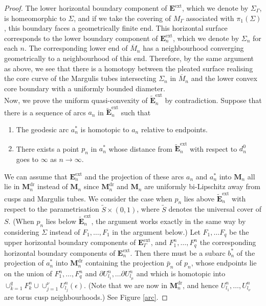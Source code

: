 \documentclass{amsart}
\theoremstyle{definition}
\begin{document}
\begin{proof}
The lower horizontal boundary component of $\mathbf E^\mathrm{ext}$, which we denote by $\Sigma_\Gamma$, is homeomorphic to $\Sigma$, and if we take the covering of $M_\Gamma$ associated with $\pi_1(\Sigma)$, this boundary faces a geometrically finite end.
This horizontal surface corresponds to the lower boundary component of $\mathbf E_n^\mathrm{ext}$, which we denote by $\Sigma_n$ for each $n$.
The corresponding lower end of $\overline M_n$ has a neighbourhood converging geometrically to a neighbourhood of this end.
Therefore, by the same argument as above, we see that there is a homotopy between the pleated surface realising the core curve of the Margulis tubes intersecting $\Sigma_n$ in $\overline{M}_n$ and the lower convex core boundary with a uniformly bounded diameter.\\

Now, we prove the uniform quasi-convexity of $\widetilde{\mathbf E}^\mathrm{ext}_n$ by contradiction.
Suppose that there is a sequence of arcs $a_n$ in $\widetilde{\mathbf E}^\mathrm{ext}_n$ such that
\begin{enumerate}
\item  The geodesic arc $a^*_n$ is homotopic to $a_n$ relative to endpoints.
\item  There exists a point $p_n$ in $a^*_n$ whose distance from $\widetilde{\mathbf E}^\mathrm{ext}_n$ with respect to $d^0_n$ goes to $\infty$ as $n \rightarrow \infty$.
\end{enumerate}

We can assume that $\mathbf E_n^\mathrm{ext}$ and the projection of these arcs $a_n$ and $a_n^*$ into $\mathbf M_n$ all lie in ${\mathbf M}_n^\mathrm{dr}$ instead of $\mathbf M_n$ since ${\mathbf M}_n^\mathrm{dr}$ and $\mathbf M_n$ are uniformly bi-Lipschitz away from cusps and Margulis tubes.
We consider the case when $p_n$ lies above $\widetilde{\mathbf E}^\mathrm{ext}_n$ with respect to the parametrisation $\widetilde S \times (0,1)$, where $\widetilde S$ denotes the universal cover of $S$.
(When $p_n$ lies below $\widetilde{\mathbf E}^\mathrm{ext}_n$, the argument works exactly in the same way by considering $\Sigma$ instead of $F_1, \dots , F_1$ in the argument below.)
Let $F_1, \dots F_q$ be the upper horizontal boundary components of $\mathbf E^\mathrm{ext}_\Gamma$, and $F^n_1, \dots , F^n_q$ the corresponding horizontal boundary components of $\mathbf E^\mathrm{ext}_n$.
Then there must be a subarc $b_n^*$ of the projection of $a_n^*$ into ${\mathbf M}_n^\mathrm{dr}$ containing the projection $\bar p_n$ of $p_n$, whose endpoints lie on the union of $F^n_1, \dots , F^n_q$ and $\partial U^n_{l_1}, \dots \partial U^n_{l_\mu}$ and which is homotopic into $\cup_{k=1}^q F^n_k \cup \cup_{j=1}^\nu U^n_{l_j}(\epsilon)$.
(Note that we are now in ${\mathbf M}_n^\mathrm{dr}$, and hence $U^n_{l_1}, \dots , U^n_{l_\nu}$ are torus cusp neighbourhoods.)
See Figure \ref{arc}.


\end{proof}
\end{document}
